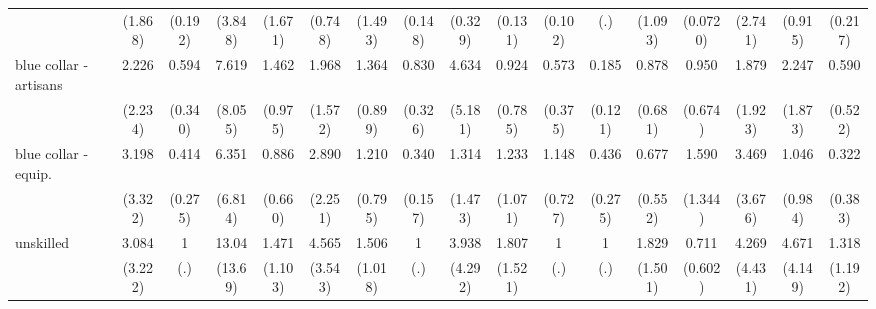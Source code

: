{\begin{tabular}{l*{16}{c}}
                    &     (1.868)         &     (0.192)         &     (3.848)         &     (1.671)         &     (0.748)         &     (1.493)         &     (0.148)         &     (0.329)         &     (0.131)         &     (0.102)         &         (.)         &     (1.093)         &    (0.0720)         &     (2.741)         &     (0.915)         &     (0.217)         \\
[1em]
blue collar - artisans&       2.226         &       0.594         &       7.619         &       1.462         &       1.968         &       1.364         &       0.830         &       4.634         &       0.924         &       0.573         &       0.185\sym{**} &       0.878         &       0.950         &       1.879         &       2.247         &       0.590         \\
                    &     (2.234)         &     (0.340)         &     (8.055)         &     (0.975)         &     (1.572)         &     (0.899)         &     (0.326)         &     (5.181)         &     (0.785)         &     (0.375)         &     (0.121)         &     (0.681)         &     (0.674)         &     (1.923)         &     (1.873)         &     (0.522)         \\
[1em]
blue collar - equip.&       3.198         &       0.414         &       6.351         &       0.886         &       2.890         &       1.210         &       0.340\sym{*}  &       1.314         &       1.233         &       1.148         &       0.436         &       0.677         &       1.590         &       3.469         &       1.046         &       0.322         \\
                    &     (3.322)         &     (0.275)         &     (6.814)         &     (0.660)         &     (2.251)         &     (0.795)         &     (0.157)         &     (1.473)         &     (1.071)         &     (0.727)         &     (0.275)         &     (0.552)         &     (1.344)         &     (3.676)         &     (0.984)         &     (0.383)         \\
[1em]
unskilled           &       3.084         &           1         &       13.04\sym{*}  &       1.471         &       4.565         &       1.506         &           1         &       3.938         &       1.807         &           1         &           1         &       1.829         &       0.711         &       4.269         &       4.671         &       1.318         \\
                    &     (3.222)         &         (.)         &     (13.69)         &     (1.103)         &     (3.543)         &     (1.018)         &         (.)         &     (4.292)         &     (1.521)         &         (.)         &         (.)         &     (1.501)         &     (0.602)         &     (4.431)         &     (4.149)         &     (1.192)         \\

\end{tabular}}
